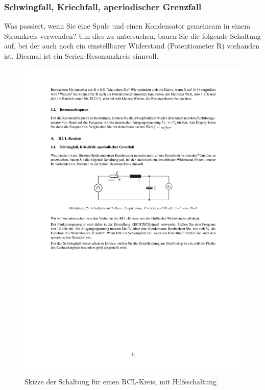 \documentclass[12pt]{scrartcl}
\begin{document}
\subsubsection{Schwingfall, Kriechfall, aperiodischer Grenzfall}
Was passiert, wenn Sie eine Spule und einen Kondensator gemeinsam in einem Stromkreis verwenden? Um dies zu untersuchen, bauen Sie die folgende Schaltung auf, bei der auch noch ein einstellbarer Widerstand (Potentiometer R) vorhanden ist. Diesmal ist ein Serien-Resonanzkreis sinnvoll.
\begin{figure}[htbp] 
  \centering
    \includegraphics[trim = 20mm 165mm 1mm 95mm, clip, scale = 1]{RCL_kreis.pdf}
  	\caption[Skizze der Schaltung für einen RCL-Kreis, mit Hilfsschaltung]{Skizze der Schaltung für einen RCL-Kreis, mit Hilfsschaltung\footnotemark}
  \label{fig:LC-Kreis_hilfe}
\end{figure}
\end{document}
